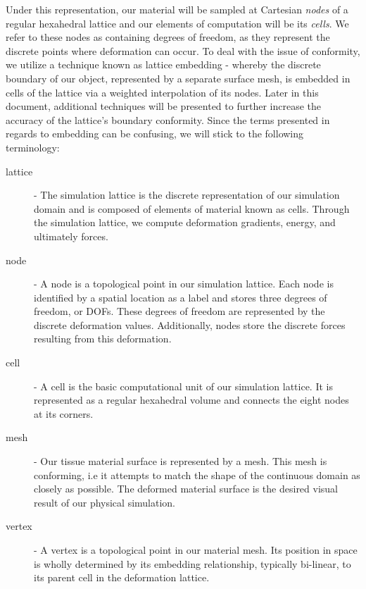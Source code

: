 
Under this representation, our material will be sampled at Cartesian
\textit{nodes} of a regular hexahedral lattice and our elements of computation
will be its \textit{cells}. We refer to these nodes as containing degrees of freedom, as
they represent the discrete points where deformation can occur. To
deal with the issue of conformity, we utilize a technique known as
lattice embedding - whereby the discrete boundary of our object,
represented by a separate surface mesh, is embedded in cells of the lattice
via a weighted interpolation of its nodes. Later in this document,
additional techniques will be presented to further increase the
accuracy of the lattice's boundary conformity. Since the
terms presented in regards to embedding can be confusing, we will
stick to the following terminology:

\begin{description}
\item[lattice] - The simulation lattice is the discrete representation
  of our simulation domain and is composed of elements of material known
  as cells. Through the simulation lattice, we compute deformation
  gradients, energy, and ultimately forces.
\item[node] - A node is a topological point in our simulation
  lattice. Each node is identified by a spatial location as a label
  and stores three degrees of freedom, or DOFs. These degrees of
  freedom are represented by the discrete deformation
  values. Additionally, nodes store the discrete forces resulting from
  this deformation.
\item[cell] - A cell is the basic computational unit of our simulation
  lattice. It is represented as a regular hexahedral volume and
  connects the eight nodes at its corners.
\item[mesh] - Our tissue material surface is represented by a mesh. This mesh
  is conforming, i.e it attempts to match the shape of the continuous
  domain as closely as possible. The deformed material surface is the
  desired visual result of our physical simulation.
\item[vertex] - A vertex is a topological point in our material
  mesh. Its position in space is wholly determined by its embedding
  relationship, typically bi-linear, to its parent cell in the
  deformation lattice.
\end{description}

